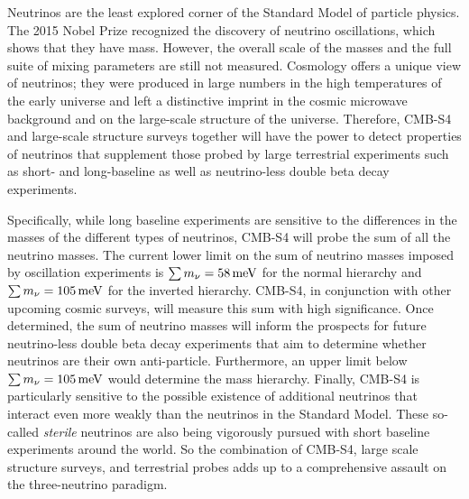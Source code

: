 Neutrinos are the least explored corner of the Standard Model of particle physics.  The 2015 Nobel Prize recognized the discovery of neutrino oscillations, which shows that they have mass. However, the overall scale of the masses and the full suite of mixing parameters are still not measured.  Cosmology offers a unique view of neutrinos; they were produced in large numbers in the high temperatures of the early universe and left a distinctive imprint in the cosmic microwave background and on the large-scale structure of the universe. Therefore, CMB-S4 and large-scale structure surveys together will have the power to detect properties of neutrinos that supplement those probed by large terrestrial experiments such as short- and long-baseline as well as neutrino-less double beta decay experiments.


Specifically, while long baseline experiments are sensitive to the differences in the masses of the different types of neutrinos, CMB-S4  will probe the sum of all the neutrino masses. The current lower limit on the sum of neutrino masses imposed by oscillation experiments is \mbox{$\sum m_\nu=58\,\rm{meV}$} for the normal hierarchy and \mbox{$\sum m_\nu=105\,\rm{meV}$} for the inverted hierarchy. CMB-S4, in conjunction with other upcoming cosmic surveys, will measure this sum with high significance. Once determined, the sum of neutrino masses will inform the prospects for future neutrino-less double beta decay experiments that aim to determine whether neutrinos are their own anti-particle. Furthermore, an upper limit below  \mbox{$\sum m_\nu=105\,\rm{meV}$} would determine the mass hierarchy. Finally, CMB-S4 is particularly sensitive to the possible existence of additional neutrinos that interact even more weakly than the neutrinos in the Standard Model. These so-called {\it sterile} neutrinos are also being vigorously pursued with short baseline experiments around the world. So the combination of CMB-S4, large scale structure surveys, and terrestrial probes adds up to a comprehensive assault on the three-neutrino paradigm.

